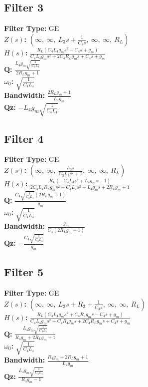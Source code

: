 \documentclass{article}
\begin{document}
\subsection*{Filter 3}
\textbf{Filter Type:} GE \\ 
\textbf{$Z(s)$:} $\left( \infty, \  \infty, \  L_{3} s + \frac{1}{C_{3} s}, \  \infty, \  \infty, \  R_{L}\right)$ \\ 
\textbf{$H(s)$:} $\frac{R_{L} \left(C_{4} L_{4} g_{m} s^{2} - C_{4} s + g_{m}\right)}{C_{4} L_{4} g_{m} s^{2} + 2 C_{4} R_{L} g_{m} s + C_{4} s + g_{m}}$ \\ 
\textbf{Q:} $\frac{L_{4} g_{m} \sqrt{\frac{1}{C_{4} L_{4}}}}{2 R_{L} g_{m} + 1}$ \\ 
\textbf{$\omega_0$:} $\sqrt{\frac{1}{C_{4} L_{4}}}$ \\ 
\textbf{Bandwidth:} $\frac{2 R_{L} g_{m} + 1}{L_{4} g_{m}}$ \\ 
\textbf{Qz:} $- L_{4} g_{m} \sqrt{\frac{1}{C_{4} L_{4}}}$ \\ 
\subsection*{Filter 4}
\textbf{Filter Type:} GE \\ 
\textbf{$Z(s)$:} $\left( \infty, \  \infty, \  \frac{L_{3} s}{C_{3} L_{3} s^{2} + 1}, \  \infty, \  \infty, \  R_{L}\right)$ \\ 
\textbf{$H(s)$:} $\frac{R_{L} \left(- C_{4} L_{4} s^{2} + L_{4} g_{m} s - 1\right)}{2 C_{4} L_{4} R_{L} g_{m} s^{2} + C_{4} L_{4} s^{2} + L_{4} g_{m} s + 2 R_{L} g_{m} + 1}$ \\ 
\textbf{Q:} $\frac{C_{4} \sqrt{\frac{1}{C_{4} L_{4}}} \left(2 R_{L} g_{m} + 1\right)}{g_{m}}$ \\ 
\textbf{$\omega_0$:} $\sqrt{\frac{1}{C_{4} L_{4}}}$ \\ 
\textbf{Bandwidth:} $\frac{g_{m}}{C_{4} \left(2 R_{L} g_{m} + 1\right)}$ \\ 
\textbf{Qz:} $- \frac{C_{4} \sqrt{\frac{1}{C_{4} L_{4}}}}{g_{m}}$ \\ 
\subsection*{Filter 5}
\textbf{Filter Type:} GE \\ 
\textbf{$Z(s)$:} $\left( \infty, \  \infty, \  L_{3} s + R_{3} + \frac{1}{C_{3} s}, \  \infty, \  \infty, \  R_{L}\right)$ \\ 
\textbf{$H(s)$:} $\frac{R_{L} \left(C_{4} L_{4} g_{m} s^{2} + C_{4} R_{4} g_{m} s - C_{4} s + g_{m}\right)}{C_{4} L_{4} g_{m} s^{2} + C_{4} R_{4} g_{m} s + 2 C_{4} R_{L} g_{m} s + C_{4} s + g_{m}}$ \\ 
\textbf{Q:} $\frac{L_{4} g_{m} \sqrt{\frac{1}{C_{4} L_{4}}}}{R_{4} g_{m} + 2 R_{L} g_{m} + 1}$ \\ 
\textbf{$\omega_0$:} $\sqrt{\frac{1}{C_{4} L_{4}}}$ \\ 
\textbf{Bandwidth:} $\frac{R_{4} g_{m} + 2 R_{L} g_{m} + 1}{L_{4} g_{m}}$ \\ 
\textbf{Qz:} $\frac{L_{4} g_{m} \sqrt{\frac{1}{C_{4} L_{4}}}}{R_{4} g_{m} - 1}$ \\ 
\end{document}
